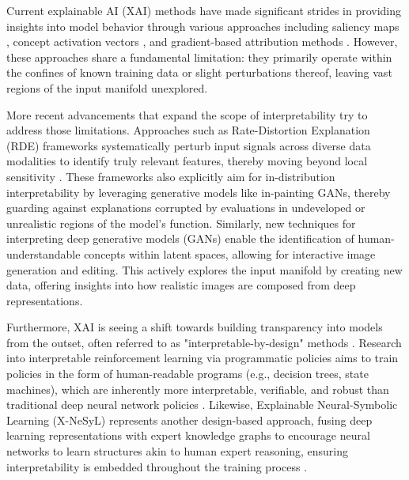 \documentclass[licencjacka,en]{pracamgr}
\begin{document}
Current explainable AI (XAI) methods have made significant strides in providing insights into model behavior through various approaches including saliency maps \citep{simonyan2014deepinsideconvolutionalnetworks}, concept activation vectors \citep{kim2018interpretabilityfeatureattributionquantitative}, and gradient-based attribution methods \citep{sundararajan2017axiomaticattributiondeepnetworks}. However, these approaches share a fundamental limitation: they primarily operate within the confines of known training data or slight perturbations thereof, leaving vast regions of the input manifold unexplored.

More recent advancements that expand the scope of interpretability try to address those limitations. Approaches such as Rate-Distortion Explanation (RDE) frameworks systematically perturb input signals across diverse data modalities to identify truly relevant features, thereby moving beyond local sensitivity \citep{Kolek2022}. These frameworks also explicitly aim for in-distribution interpretability by leveraging generative models like in-painting GANs, thereby guarding against explanations corrupted by evaluations in undeveloped or unrealistic regions of the model's function. Similarly, new techniques for interpreting deep generative models (GANs) enable the identification of human-understandable concepts within latent spaces, allowing for interactive image generation and editing. This actively explores the input manifold by creating new data, offering insights into how realistic images are composed from deep representations. \citep{zhou2022interpretinggenerativeadversarialnetworks, Karimi2022}

Furthermore, XAI is seeing a shift towards building transparency into models from the outset, often referred to as "interpretable-by-design" methods \citep{Karimi2022, Holzinger2022a}. Research into interpretable reinforcement learning via programmatic policies aims to train policies in the form of human-readable programs (e.g., decision trees, state machines), which are inherently more interpretable, verifiable, and robust than traditional deep neural network policies \citep{inbook, Inala2020Synthesizing, verma2019programmaticallyinterpretablereinforcementlearning}. Likewise, Explainable Neural-Symbolic Learning (X-NeSyL) represents another design-based approach, fusing deep learning representations with expert knowledge graphs to encourage neural networks to learn structures akin to human expert reasoning, ensuring interpretability is embedded throughout the training process \citep{D_az_Rodr_guez_2022, karimi2020algorithmicrecoursecounterfactualexplanations}.
\end{document}
